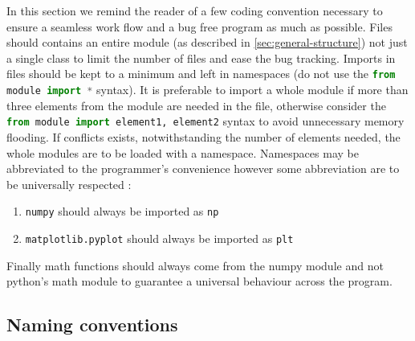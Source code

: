 \documentclass[]{article}
\begin{document}
In this section we remind the reader of a few coding convention necessary to ensure a seamless work flow and a bug free program as much as possible.
Files should contains an entire module (as described in \ref{sec:general-structure}) not just a single class to limit the number of files and ease the bug tracking.
Imports in files should be kept to a minimum and left in namespaces (do not use the \lstinline[columns=fixed,language=Python]|from module import *| syntax). It is preferable to import a whole module if more than three elements from the module are needed in the file, otherwise consider the \lstinline[columns=fixed,language=Python]|from module import element1, element2| syntax to avoid unnecessary memory flooding. If conflicts exists, notwithstanding the number of elements needed, the whole modules are to be loaded with a namespace.
Namespaces may be abbreviated to the programmer's convenience however some abbreviation are to be universally respected :
\begin{enumerate}[label=(\roman*)]
	\item \texttt{numpy} should always be imported as \texttt{np}
	\item \texttt{matplotlib.pyplot} should always be imported as \texttt{plt}
\end{enumerate}

Finally math functions should always come from the numpy module and not python's math module to guarantee a universal behaviour across the program.

\subsection{Naming conventions}\label{sec:naming-conventions}
\end{document}

